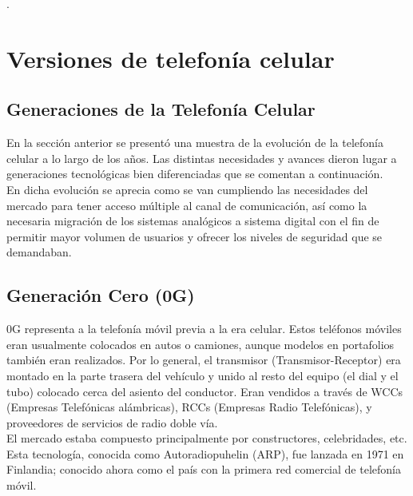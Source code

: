 \documentclass[]{article}
\begin{document}
	
.\\[5cm]

\tableofcontents  %


\section{Versiones de telefonía celular}

\subsection{Generaciones de la Telefonía Celular}

En la sección anterior se presentó una muestra de la evolución de la telefonía
celular a lo largo de los años. Las distintas necesidades y avances dieron lugar a
generaciones tecnológicas bien diferenciadas que se comentan a continuación.\\

En dicha evolución se aprecia como se van cumpliendo las necesidades del
mercado para tener acceso múltiple al canal de comunicación, así como la
necesaria migración de los sistemas analógicos a sistema digital con el fin de
permitir mayor volumen de usuarios y ofrecer los niveles de seguridad que se
demandaban.\\

\subsection{Generación Cero (0G)}

0G representa a la telefonía móvil previa a la era celular. Estos teléfonos móviles
eran usualmente colocados en autos o camiones, aunque modelos en portafolios
también eran realizados. Por lo general, el transmisor (Transmisor-Receptor) era
montado en la parte trasera del vehículo y unido al resto del equipo (el dial y el
tubo) colocado cerca del asiento del conductor.
Eran vendidos a través de WCCs (Empresas Telefónicas alámbricas), RCCs
(Empresas Radio Telefónicas), y proveedores de servicios de radio doble vía.\\

 El
mercado estaba compuesto principalmente por constructores, celebridades, etc.
Esta tecnología, conocida como Autoradiopuhelin (ARP), fue lanzada en 1971 en
Finlandia; conocido ahora como el país con la primera red comercial de telefonía
móvil.\\
\end{document}
